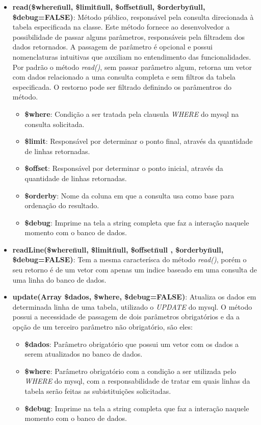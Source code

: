 \begin{itemize}
                \item\textbf{read(\$where\=null, \$limit\=null, \$offset\=null, \$orderby\=null, \$debug=FALSE)}: Método público, responsável pela consulta direcionada à tabela especificada na classe. Este método fornece ao desenvolvedor a possibilidade de passar alguns parâmetros, responsáveis pela filtradem dos dados retornados. A passagem de parâmetro é opcional e possui nomenclaturas intuitivas que auxiliam no entendimento das funcionalidades. Por padrão o método \emph{read()}, sem passar parâmetro algum, retorna um vetor com dados relacionado a uma consulta completa e sem filtros da tabela especificada. O restorno pode ser filtrado definindo os parâmentros do método.
                \begin{itemize}
                    \item\textbf{\$where}: Condição a ser tratada pela clausula \emph{WHERE} do mysql na consulta solicitada.
                    \item\textbf{\$limit}: Responsável por determinar o ponto final, através da quantidade de linhas retornadas.
                    \item\textbf{\$offset}: Responsável por determinar o ponto inicial, através da quantidade de linhas retornadas.
                    \item\textbf{\$orderby}: Nome da coluna em que a consulta usa como base para ordenação do resultado.
                    \item\textbf{\$debug}: Imprime na tela a string completa que faz a interação naquele momento com o banco de dados.
                \end{itemize}

                \item\textbf{readLine(\$where\=null, \$limit\=null, \$offset\=null , \$orderby\=null, \$debug=FALSE)}: Tem a mesma caracterísca do método \emph{read()}, porém o seu retorno é de um vetor com apenas um indice baseado em uma consulta de uma linha do banco de dados.

                \item\textbf{update(Array \$dados, \$where, \$debug=FALSE)}: Atualiza os dados em determinada linha de uma tabela, utilizado o \emph{UPDATE} do mysql. O método possui a necessidade de passagem de dois parâmetros obrigatórios e da a opção de um terceiro parâmetro não obrigatório, são eles:
                \begin{itemize}
                    \item\textbf{\$dados}: Parâmetro obrigatório que possui um vetor com os dados a serem atualizados no banco de dados.
                    \item\textbf{\$where}: Parâmetro obrigatório com a condição a ser utilizada pelo \emph{WHERE} do mysql, com a responsabilidade de tratar em quais linhas da tabela serão feitas as subistituições solicitadas.
                    \item\textbf{\$debug}: Imprime na tela a string completa que faz a interação naquele momento com o banco de dados.
                \end{itemize}


\end{itemize}
